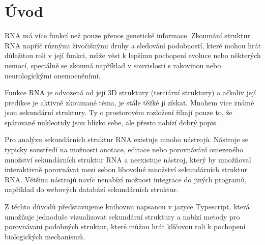 \chapter*{Úvod}

RNA má více funkcí než pouze přenos genetické informace. Zkoumání struktur RNA
napříč různými živočišnými druhy a sledování podobností, které mohou hrát
důležitou roli v její funkci, může vést k lepšímu pochopení
evoluce\cite{kyticky} nebo některých nemocí\cite{disease}, speciálně se zkoumá
například v souvislosti s rakovinou\cite{cancer, cancer2} nebo neurologickými
onemocněními\cite{neuro, neuro2}.

Funkce RNA je odvozená od její 3D struktury (terciární struktury) a ačkoliv
její predikce je aktivně zkoumané téma\cite{3DStructure1, 3DStructure2}, je
stále těžké jí získat. Mnohem více známé jsou sekundární struktury. Ty o
prostorovém rozložení říkají pouze to, že spárované nukleotidy jsou blízko
sebe, ale přesto nabízí dobrý popis.

Pro analýzu sekundárních struktur RNA existuje mnoho nástrojů. Nástroje se
typicky soustředí na možnosti anotace, editace nebo porovnávání omezeného
množství sekundárních struktur RNA a neexistuje nástroj, který by umožňoval
interaktivně porovnávat mezi sebou libovolné množství sekundárních struktur
RNA. Většina nástrojů navíc nenabízí možnost integrace do jiných programů,
například do webových databází sekundárních struktur.

Z těchto důvodů představujeme knihovnu napsanou v jazyce Typescript, která
umožňuje jednoduše vizualizovat sekundární struktury a nabízí metody pro
porovnávaní podobných struktur, které můžou hrát klíčovou roli k pochopení
biologických mechanismů.
